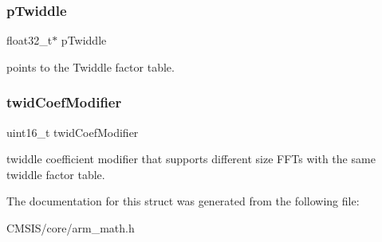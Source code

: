 \subsubsection{\texorpdfstring{p\+Twiddle}{pTwiddle}}
{\footnotesize\ttfamily float32\+\_\+t$\ast$ p\+Twiddle}

points to the Twiddle factor table. \mbox{\label{structarm__cfft__radix2__instance__f32_afe772e5b5001c9d8e85032115a8df5bf}} 
\subsubsection{\texorpdfstring{twid\+Coef\+Modifier}{twidCoefModifier}}
{\footnotesize\ttfamily uint16\+\_\+t twid\+Coef\+Modifier}

twiddle coefficient modifier that supports different size F\+F\+Ts with the same twiddle factor table. 

The documentation for this struct was generated from the following file\+:\begin{DoxyCompactItemize}
\item 
C\+M\+S\+I\+S/core/arm\+\_\+math.\+h\end{DoxyCompactItemize}
